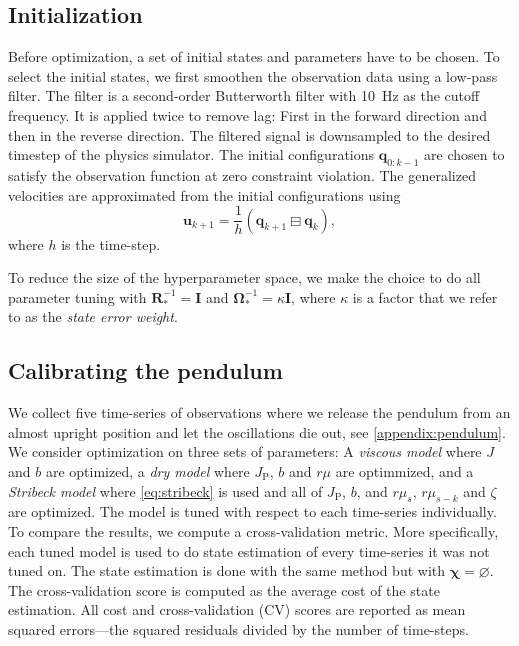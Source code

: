 \documentclass[preprint,12pt]{elsarticle}
\let\vec\bm
\let\mat\mathbf
\def\param{\vec{\chi}}
\let\amssymbboxminus\boxminus
\renewcommand{\boxminus}{\mathbin{\mathop\amssymbboxminus}}
\numberwithin{equation}{section}
\def\tP{\text{P}}
\begin{document}
\subsection{Initialization}
\label{sec:initialization}
Before optimization, a set of initial states and parameters have to be chosen.
To select the initial states, we first smoothen the observation data using a low-pass filter.
The filter is a second-order Butterworth filter with \SI{10}{Hz} as the cutoff frequency.
It is applied twice to remove lag:
First in the forward direction and then in the reverse direction.
The filtered signal is downsampled to the desired timestep of the physics simulator.
The initial configurations $\vec{q}_{0:k-1}$ are chosen to satisfy the observation function at zero constraint violation.
The generalized velocities are approximated from the initial configurations using
\begin{equation}
    \vec{u}_{k+1} = \frac{1}{h}(\vec{q}_{k+1} \boxminus \vec{q}_{k}),
\end{equation}
where $h$ is the time-step.

To reduce the size of the hyperparameter space, we make the choice to do all parameter tuning with $\mat{R}_*^{-1} = \mat{I}$ and $\mat{\Omega}_*^{-1} = \kappa \mat{I}$, where $\kappa$ is a factor that we refer to as the \emph{state error weight}.

\subsection{Calibrating the pendulum}
We collect five time-series of observations where we release the pendulum from an almost upright position and let the oscillations die out, see \ref{appendix:pendulum}.
We consider optimization on three sets of parameters:
A \emph{viscous model} where $J$ and $b$ are optimized, a \emph{dry model} where $J_\tP$, $b$ and $r\mu$ are optimmized, and a \emph{Stribeck model} where \eqref{eq:stribeck} is used and all of $J_\tP$, $b$, and $r \mu_s$, $r \mu_{s-k}$ and $\zeta$ are optimized.
The model is tuned with respect to each time-series individually.
To compare the results, we compute a cross-validation metric.
More specifically, each tuned model is used to do state estimation of every time-series it was not tuned on.
The state estimation is done with the same method but with $\param = \varnothing$.
The cross-validation score is computed as the average cost of the state estimation.
All cost and cross-validation (CV) scores are reported as mean squared errors---the squared residuals divided by the number of time-steps.
\end{document}
